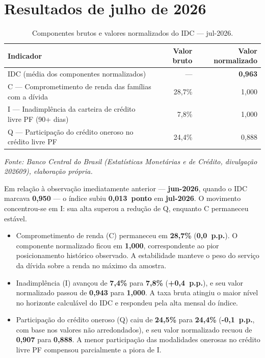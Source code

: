 \documentclass[11pt,a4paper]{article}
\newcommand{\fonte}[1]{%
  \par\vspace{0.2\baselineskip}%
  \small\textit{Fonte: #1}\par\vspace{0.8\baselineskip}%
}
\newcommand{\mesreferencia}{julho de 2026}
\newcommand{\mesref}{jul-2026}
\newcommand{\mesanterior}{jun-2026}
\newcommand{\competencia}{202609}
\begin{document}
\section{Resultados de \mesreferencia}

\begin{table}[htbp]
  \centering
  \caption{Componentes brutos e valores normalizados do IDC --- \mesref.}
  \label{tab:componentes}
  \begin{tabular}{>{\raggedright\arraybackslash}p{8.0cm}rr}
    \toprule
    Indicador & Valor bruto & Valor normalizado \\
    \midrule
    IDC (média dos componentes normalizados)
      & ---
      & \textbf{0,963} \\
    C --- Comprometimento de renda das famílias com a dívida
      & 28,7\%
      & 1,000 \\
    I --- Inadimplência da carteira de crédito livre PF (90+ dias)
      & 7,8\%
      & 1,000 \\
    Q --- Participação do crédito oneroso no crédito livre PF
      & 24,4\%
      & 0,888 \\
    \bottomrule
  \end{tabular}
\end{table}

\fonte{Banco Central do Brasil (Estatísticas Monetárias e de Crédito,
divulgação \competencia), elaboração própria.}

Em relação à observação imediatamente anterior --- \textbf{\mesanterior}, quando o IDC
marcava \textbf{0,950} --- o índice subiu
\textbf{0,013~ponto} em \textbf{\mesref}.
O movimento concentrou-se em I: sua alta superou a redução de Q, enquanto C
permaneceu estável.

\begin{itemize}
  \item Comprometimento de renda (C) permaneceu em \textbf{28,7\%}
    (\textbf{0,0~p.p.}). O componente normalizado ficou em \textbf{1,000},
    correspondente ao pior posicionamento histórico observado. A estabilidade
    manteve o peso do serviço da dívida sobre a renda no máximo da amostra.

  \item Inadimplência (I) avançou de \textbf{7,4\%} para
    \textbf{7,8\%} (\textbf{+0,4~p.p.}), e seu valor normalizado passou de
    \textbf{0,943} para \textbf{1,000}. A taxa bruta atingiu o maior nível
    no horizonte calculável do IDC e respondeu pela alta mensal do índice.

  \item Participação do crédito oneroso (Q) caiu de \textbf{24,5\%} para
    \textbf{24,4\%} (\textbf{-0,1~p.p.}, com base nos valores não arredondados),
    e seu valor normalizado recuou de \textbf{0,907} para \textbf{0,888}.
    A menor participação das modalidades onerosas no crédito livre PF
    compensou parcialmente a piora de I.
\end{itemize}
\end{document}
